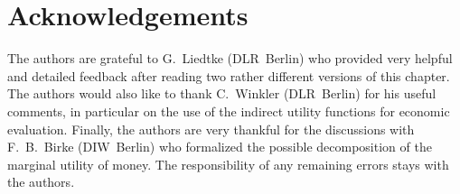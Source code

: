 \section*{Acknowledgements}
The authors are grateful to G.~Liedtke (DLR~Berlin) who provided very helpful and detailed feedback after reading two rather different versions of this chapter.
%
The authors would also like to thank C.~Winkler (DLR~Berlin) for his useful comments, in particular on the use of the indirect utility functions for economic evaluation.
%
Finally, the authors are very thankful for the discussions with F.~B.~Birke (DIW~Berlin) who formalized the possible decomposition of the marginal utility of money.
%
The responsibility of any remaining errors stays with the authors.


